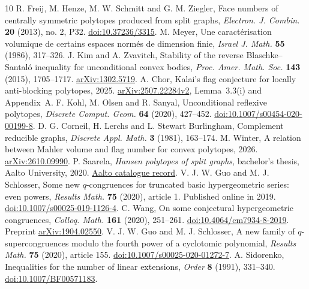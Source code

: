 \documentclass[11pt,a4paper]{article}
\numberwithin{equation}{section}
\begin{document}
\begin{thebibliography}{10}
 R. Freij, M. Henze, M. W. Schmitt and G. M. Ziegler, Face numbers of centrally symmetric polytopes produced from split graphs, \emph{Electron. J. Combin.} \textbf{20} (2013), no. 2, P32. \href{https://doi.org/10.37236/3315}{doi:10.37236/3315}.
 M. Meyer, Une caract\'erisation volumique de certains espaces norm\'es de dimension finie, \emph{Israel J. Math.} \textbf{55} (1986), 317--326.
 J. Kim and A. Zvavitch, Stability of the reverse Blaschke--Santal\'o inequality for unconditional convex bodies, \emph{Proc. Amer. Math. Soc.} \textbf{143} (2015), 1705--1717. \href{https://arxiv.org/abs/1302.5719}{arXiv:1302.5719}.
 A. Chor, Kalai's flag conjecture for locally anti-blocking polytopes, 2025. \href{https://arxiv.org/abs/2507.22284}{arXiv:2507.22284v2}, Lemma~3.3(i) and Appendix~A.
 F. Kohl, M. Olsen and R. Sanyal, Unconditional reflexive polytopes, \emph{Discrete Comput. Geom.} \textbf{64} (2020), 427--452. \href{https://doi.org/10.1007/s00454-020-00199-8}{doi:10.1007/s00454-020-00199-8}.
 D. G. Corneil, H. Lerchs and L. Stewart Burlingham, Complement reducible graphs, \emph{Discrete Appl. Math.} \textbf{3} (1981), 163--174.
 M. Winter, A relation between Mahler volume and flag number for convex polytopes, 2026. \href{https://arxiv.org/abs/2610.09990}{arXiv:2610.09990}.
 P. Saarela, \emph{Hansen polytopes of split graphs}, bachelor's thesis, Aalto University, 2020. \href{https://urn.fi/URN:NBN:fi:aalto-202010205919}{Aalto catalogue record}.
 V. J. W. Guo and M. J. Schlosser, Some new $q$-congruences for truncated basic hypergeometric series: even powers, \emph{Results Math.} \textbf{75} (2020), article 1. Published online in 2019. \href{https://doi.org/10.1007/s00025-019-1126-4}{doi:10.1007/s00025-019-1126-4}.
 C. Wang, On some conjectural hypergeometric congruences, \emph{Colloq. Math.} \textbf{161} (2020), 251--261. \href{https://doi.org/10.4064/cm7934-8-2019}{doi:10.4064/cm7934-8-2019}. Preprint \href{https://arxiv.org/abs/1904.02550}{arXiv:1904.02550}.
 V. J. W. Guo and M. J. Schlosser, A new family of $q$-supercongruences modulo the fourth power of a cyclotomic polynomial, \emph{Results Math.} \textbf{75} (2020), article 155. \href{https://doi.org/10.1007/s00025-020-01272-7}{doi:10.1007/s00025-020-01272-7}.
 A. Sidorenko, Inequalities for the number of linear extensions, \emph{Order} \textbf{8} (1991), 331--340. \href{https://doi.org/10.1007/BF00571183}{doi:10.1007/BF00571183}.

\end{thebibliography}
\end{document}
